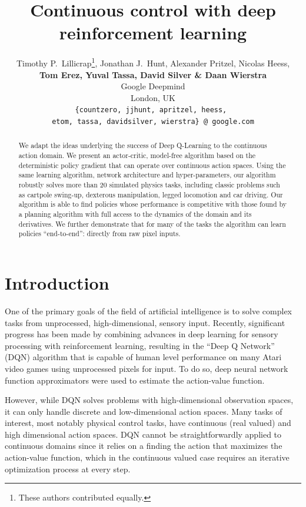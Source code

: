 \documentclass{article} %
\title{Continuous control with deep reinforcement learning}
\author{
\hspace{-1mm}Timothy P.~Lillicrap\thanks{These authors contributed equally.},
Jonathan J.~Hunt\footnotemark[1],
Alexander Pritzel,
Nicolas Heess,\\
\textbf{Tom Erez,
Yuval Tassa,
David Silver \&
Daan Wierstra}
\\
Google Deepmind \\
London, UK\\
\texttt{\{countzero, jjhunt, apritzel, heess,
  } \\
  \texttt{\phantom{\{}etom, tassa, davidsilver,
  wierstra\} @ google.com}
}
\begin{document}
\maketitle

\begin{abstract}
  We adapt the ideas underlying the success of Deep Q-Learning
  to the
  continuous action domain. We present an actor-critic, model-free
  algorithm based on the deterministic policy gradient that can operate
  over continuous action spaces.  Using the same learning algorithm,
  network architecture and hyper-parameters, our algorithm
  robustly solves more than 20 simulated physics tasks, including classic
  problems such as cartpole swing-up, dexterous manipulation,
  legged locomotion and car driving. Our algorithm is
  able to find policies whose performance is competitive with those
  found by a planning algorithm with full access to the dynamics
  of the domain and its derivatives. We further
  demonstrate that for many of the tasks the algorithm can learn
  policies ``end-to-end'': directly from raw pixel inputs.
\end{abstract}

\section{Introduction}

One of the primary goals of the field of artificial intelligence is to
solve complex tasks from
unprocessed, high-dimensional, sensory input.
Recently, significant progress has been made by combining advances in
deep learning for sensory processing \citep{krizhevsky2012imagenet}
with reinforcement learning,
resulting in the ``Deep Q Network'' (DQN) algorithm \citep{mnih2015human}
that is capable of human level performance on many Atari video games
using unprocessed pixels for input. To do so, deep neural
network function approximators were used to estimate the action-value
function.

However, while DQN solves problems with high-dimensional observation spaces,
it can only handle discrete and low-dimensional action spaces.
Many tasks of interest, most notably physical control tasks, have
continuous (real valued) and high dimensional action spaces.  DQN
cannot be straightforwardly applied
to continuous domains since it relies on a finding the
action that maximizes the action-value function, which in the
continuous valued case requires an iterative optimization process at
every step.
\end{document}
